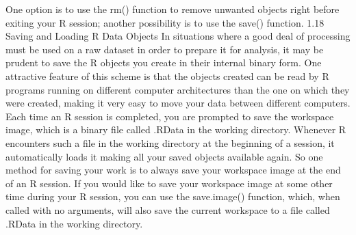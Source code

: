 One option is to use the rm() function to remove unwanted objects right before exiting your R
session; another possibility is to use the save() function.
1.18 Saving and Loading R Data Objects
In situations where a good deal of processing must be used on a raw dataset in order to prepare
it for analysis, it may be prudent to save the R objects you create in their internal binary form.
One attractive feature of this scheme is that the objects created can be read by R programs
running on different computer architectures than the one on which they were created, making it
very easy to move your data between different computers. Each time an R session is completed,
you are prompted to save the workspace image, which is a binary file called .RData in the
working directory.
Whenever R encounters such a file in the working directory at the beginning of a session,
it automatically loads it making all your saved objects available again. So one method for
saving your work is to always save your workspace image at the end of an R session. If you
would like to save your workspace image at some other time during your R session, you can use
the save.image() function, which, when called with no arguments, will also save the current
workspace to a file called .RData in the working directory.

